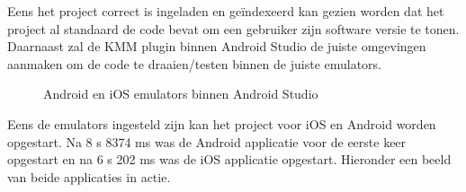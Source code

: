 Eens het project correct is ingeladen en geïndexeerd kan gezien worden dat het project al standaard de code bevat om een gebruiker zijn software versie te tonen. Daarnaast zal de KMM plugin binnen Android Studio de juiste omgevingen aanmaken om de code te draaien/testen binnen de juiste emulators. 

\begin{figure}
    \centering
    
    
    \caption{Android en iOS emulators binnen Android Studio}
    \label{fig:M-as-emulators}
\end{figure}

Eens de emulators ingesteld zijn kan het project voor iOS en Android worden opgestart. Na 8 s 8374 ms was de Android applicatie voor de eerste keer opgestart en na 6 s 202 ms was de iOS applicatie opgestart. Hieronder een beeld van beide applicaties in actie.

